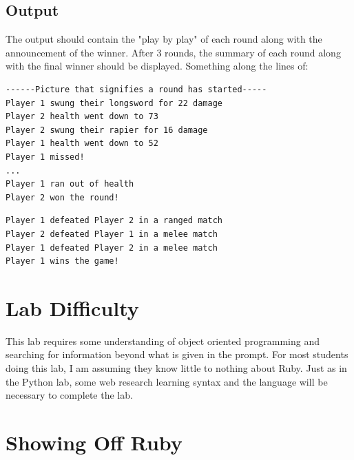 \documentclass{article}
\begin{document}
\subsection*{Output}
The output should contain the "play by play" of each round along with the announcement of the winner. After 3 rounds, the summary of each round along with the final winner should be displayed. Something along the lines of:
\begin{lstlisting}
------Picture that signifies a round has started-----
Player 1 swung their longsword for 22 damage
Player 2 health went down to 73
Player 2 swung their rapier for 16 damage
Player 1 health went down to 52
Player 1 missed!
...
Player 1 ran out of health
Player 2 won the round!
\end{lstlisting}
\begin{lstlisting}
Player 1 defeated Player 2 in a ranged match
Player 2 defeated Player 1 in a melee match
Player 1 defeated Player 2 in a melee match
Player 1 wins the game!
\end{lstlisting}

\section*{Lab Difficulty}
\begin{description}[noitemsep]
\item [Medium:] This lab requires some understanding of object oriented programming and searching for information beyond what is given in the prompt. For most students doing this lab, I am assuming they know little to nothing about Ruby. Just as in the Python lab, some web research learning syntax and the language will be necessary to complete the lab.
\end{description}

\section*{Showing Off Ruby} 
\end{document}
